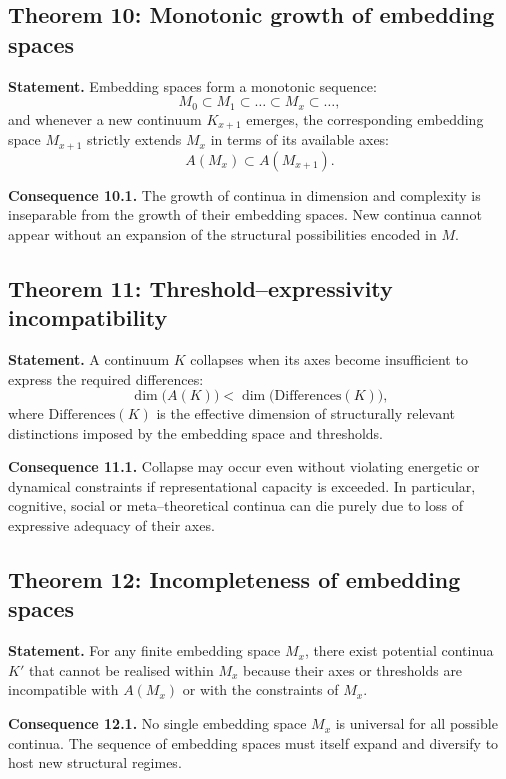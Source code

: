 \subsection{Theorem 10: Monotonic growth of embedding spaces}

\textbf{Statement.}
Embedding spaces form a monotonic sequence:
\[
    M_0 \subset M_1 \subset \dots \subset M_x \subset \dots,
\]
and whenever a new continuum \(K_{x+1}\) emerges, the corresponding embedding space \(M_{x+1}\) strictly extends \(M_x\) in terms of its available axes:
\[
    A(M_{x}) \subset A(M_{x+1}).
\]

\textbf{Consequence 10.1.}
The growth of continua in dimension and complexity is inseparable from the growth of their embedding spaces.
New continua cannot appear without an expansion of the structural possibilities encoded in \(M\).

\subsection{Theorem 11: Threshold–expressivity incompatibility}

\textbf{Statement.}
A continuum \(K\) collapses when its axes become insufficient to express the required differences:
\[
    \dim\big(A(K)\big) < \dim\big(\mathrm{Differences}(K)\big),
\]
where \(\mathrm{Differences}(K)\) is the effective dimension of structurally relevant distinctions imposed by the embedding space and thresholds.

\textbf{Consequence 11.1.}
Collapse may occur even without violating energetic or dynamical constraints if representational capacity is exceeded.
In particular, cognitive, social or meta–theoretical continua can die purely due to loss of expressive adequacy of their axes.

\subsection{Theorem 12: Incompleteness of embedding spaces}

\textbf{Statement.}
For any finite embedding space \(M_x\), there exist potential continua \(K'\) that cannot be realised within \(M_x\) because their axes or thresholds are incompatible with \(A(M_x)\) or with the constraints of \(M_x\).

\textbf{Consequence 12.1.}
No single embedding space \(M_x\) is universal for all possible continua.
The sequence of embedding spaces must itself expand and diversify to host new structural regimes.

